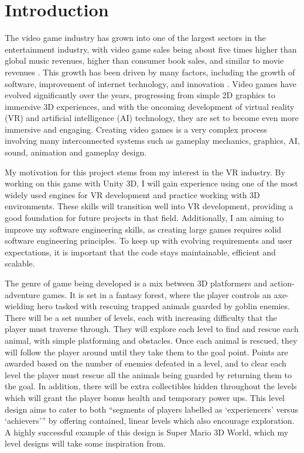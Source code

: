 \documentclass[]{final_report}
\begin{document}
\chapter{Introduction}
The video game industry has grown into one of the largest sectors in the entertainment industry, with video game sales being about five times higher than global music revenues, higher than consumer book sales, and similar to movie revenues \cite{marchand2013value}. This growth has been driven by many factors, including the growth of software, improvement of internet technology, and innovation \cite{zackariasson2012video} . Video games have evolved significantly over the years, progressing from simple 2D graphics to immersive 3D experiences, and with the oncoming development of virtual reality (VR) and artificial intelligence (AI) technology, they are set to become even more immersive and engaging. Creating video games is a very complex process involving many interconnected systems such as gameplay mechanics, graphics, AI, sound, animation and gameplay design. \newline

My motivation for this project stems from my interest in the VR industry. By working on this game with Unity 3D, I will gain experience using one of the most widely used engines for VR development and practice working with 3D environments. These skills will transition well into VR development, providing a good foundation for future projects in that field. Additionally, I am aiming to improve my software engineering skills, as creating large games requires solid software engineering principles. To keep up with evolving requirements and user expectations, it is important that the code stays maintainable, efficient and scalable.\newline

The genre of game being developed is a mix between 3D platformers and action-adventure games. It is set in a fantasy forest, where the player controls an axe-wielding hero tasked with rescuing trapped animals guarded by goblin enemies. There will be a set number of levels, each with increasing difficulty that the player must traverse through. They will explore each level to find and rescue each animal, with simple platforming and obstacles. Once each animal is rescued, they will follow the player around until they take them to the goal point. Points are awarded based on the number of enemies defeated in a level, and to clear each level the player must rescue all the animals being guarded by returning them to the goal. In addition, there will be extra collectibles hidden throughout the levels which will grant the player bonus health and temporary power ups. This level design aims to cater to both ``segments of players labelled as `experiencers' versus `achievers''' \cite{zhao2022dynamic} by offering contained, linear levels which also encourage exploration. A highly successful example of this design is Super Mario 3D World, which my level designs will take some inspiration from.\newline
\end{document}
